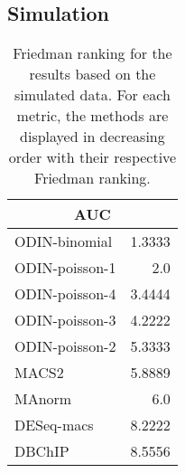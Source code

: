 \subsection{Simulation}

\begin{table}[h!]
\begin{center}
\renewcommand{\arraystretch}{1.2}
  \begin{tabular}{ |lr| }
    \hline
    \multicolumn{2}{|c|}{\textbf{AUC}} \\
    \hline
    ODIN-binomial & 1.3333 \\
    ODIN-poisson-1 & 2.0 \\
    ODIN-poisson-4 & 3.4444 \\
    ODIN-poisson-3 & 4.2222 \\
    ODIN-poisson-2 & 5.3333 \\
    MACS2 & 5.8889 \\
    MAnorm & 6.0 \\
    DESeq-macs & 8.2222 \\
    DBChIP & 8.5556 \\
    \hline
  \end{tabular}
\end{center}
\caption[Friedman ranking of simulated data without replicates]{Friedman ranking for the results based on the simulated data. For each metric, the methods are displayed in decreasing order with their respective Friedman ranking.}
\label{tab_sim_ranking_without_rep}
\end{table}




\newpage
